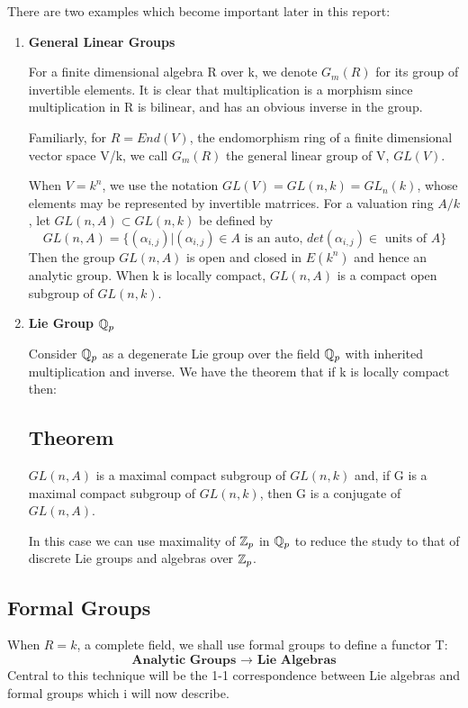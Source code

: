 There are two examples which become important later in this
report:
\begin{enumerate}
    \item \textbf{General Linear Groups}

For a finite dimensional algebra R over k, we denote $G_m(R)$ for
its group of invertible elements. It is clear that multiplication
is a morphism since multiplication in R is bilinear, and has an
obvious inverse in the group.

Familiarly, for $R = End(V)$, the endomorphism ring of a finite
dimensional vector space V/k, we call $G_m(R)$ the general linear
group of V, $GL(V)$.

When $V=k^n$, we use the notation $GL(V) = GL(n,k) = {GL}_n(k)$,
whose elements may be represented by invertible matrrices. For a
valuation ring $A/k$, let $GL(n,A)\subset GL(n,k)$ be defined by
$$GL(n,A) = \{ (\alpha_{i,j}) | (\alpha_{i,j})\in A\text{ is an auto, } det(\alpha_{i,j})\in\text{ units of }A
\}$$ Then the group $GL(n,A)$ is open and closed in $E(k^n)$ and
hence an analytic group. When k is locally compact, $GL(n,A)$ is a
compact open subgroup of $GL(n,k)$.
    \item \textbf{Lie Group $\mathbb Q_p$}

    Consider $\mathbb Q_p$ as a degenerate Lie group over the field $\mathbb Q_p$
    with inherited multiplication and inverse. We have the theorem
    that if k is locally compact then:
    \subsection{Theorem}\label{df2.2.2}\label{df2.2.3}
    $GL(n,A)$ is a maximal compact subgroup of $GL(n,k)$ and, if G
    is a maximal compact subgroup of $GL(n,k)$, then G is a
    conjugate of $GL(n,A)$.

    In this case we can use maximality of $\mathbb Z_p$ in $\mathbb Q_p$ to reduce
    the study to that of discrete Lie groups and algebras over
    $\mathbb Z_p$.

    \end{enumerate}


\subsection{Formal Groups}\label{df2.3}

When $R=k$, a complete field, we shall use formal groups to define
a functor T:
$$\textbf{Analytic Groups $\rightarrow$ Lie Algebras}$$
Central to this technique will be the 1-1 correspondence between
Lie algebras and formal groups which i will now describe.

